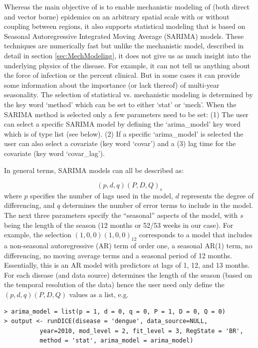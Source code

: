 \documentclass[a4paper]{article}
\begin{document}
Whereas the main objective of  is to enable mechanistic modeling of (both direct and vector borne) epidemics on an arbitrary spatial scale with or without coupling between regions, it also supports statistical modeling that is based on Seasonal Autoregressive Integrated Moving Average (SARIMA) models.  These techniques are numerically fast but unlike the mechanistic model, described in detail in section \ref{sec:MechModeling}, it does not give us as much insight into the underlying physics of the disease.  For example, it can not tell us anything about the force of infection or the percent clinical.  But in some cases it can provide some information about the importance (or lack thereof) of multi-year seasonality. The selection of statistical vs. mechanistic modeling is determined by the key word `method' which can be set to either `stat' or `mech'.  When the SARIMA method is selected only a few parameters need to be set: (1) The user can select a specific SARIMA model by defining the `arima\_model' key word which is of type list (see below).  (2) If a specific `arima\_model' is selected the user can also select a covariate (key word `covar') and a (3) lag time for the covariate (key word `covar\_lag').

In general terms, SARIMA models can all be described as:

\begin{equation}
(p,d,q)(P,D,Q)_s
\end{equation}
where $p$ specifies the number of lags used in the model, $d$ represents the degree of differencing, and $q$ determines the number of error terms to include in the model. The next three parameters specify the ``seasonal'' aspects of the model, with $s$ being the length of the season (12 months or 52/53 weeks in our case).
For example, the selection $(1,0,0)(1,0,0)_{12}$ corresponds to a model that includes a non-seasonal autoregressive (AR) term of order one, a seasonal AR(1) term, no differencing, no moving average terms and a seasonal period of 12 months. Essentially, this is an AR model with predictors at lags of 1, 12, and 13 months. For each disease (and data source)  determines the length of the season (based on the temporal resolution of the data) hence the user need only define the $(p,d,q)(P,D,Q)$ values as a list, e.g.

\begin{verbatim}
> arima_model = list(p = 1, d = 0, q = 0, P = 1, D = 0, Q = 0)
> output <- runDICE(disease = 'dengue', data_source=NULL,
          year=2010, mod_level = 2, fit_level = 3, RegState = 'BR',
          method = 'stat', arima_model = arima_model)
\end{verbatim}
\end{document}
